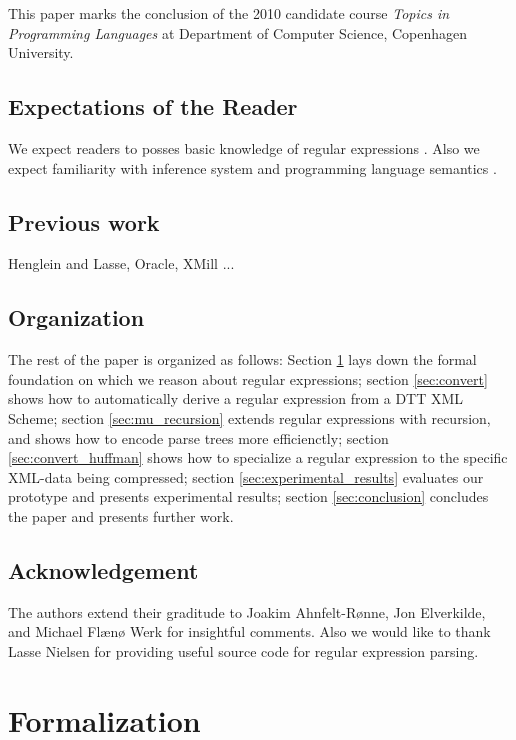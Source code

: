 \documentclass[a4paper, oneside]{memoir}
\theoremstyle{definition}
\begin{document}
This paper marks the conclusion of the 2010 candidate course \emph{Topics in Programming Languages} at Department of Computer Science, Copenhagen University.

\subsection{Expectations of the Reader}

We expect readers to posses basic knowledge of regular expressions \cite{FIX ME}. Also we expect familiarity with inference system and programming language semantics \cite{FIX ME}.

\subsection{Previous work}

Henglein and Lasse, Oracle, XMill ...

\subsection{Organization}

The rest of the paper is organized as follows:
Section \ref{sec:formalization} lays down the formal foundation on which we reason about regular expressions;
section \ref{sec:convert} shows how to automatically derive a regular expression from a DTT XML Scheme;
section \ref{sec:mu_recursion} extends regular expressions with recursion, and shows how to encode parse trees more efficienctly;
section \ref{sec:convert_huffman} shows how to specialize a regular expression to the specific XML-data being compressed;
section \ref{sec:experimental_results} evaluates our prototype and presents experimental results;
section \ref{sec:conclusion} concludes the paper and presents further work.

\subsection{Acknowledgement}

The authors extend their graditude to Joakim Ahnfelt-Rønne, Jon Elverkilde, and Michael Flænø Werk for insightful comments. Also we would like to thank Lasse Nielsen for providing useful source code for regular expression parsing.

\newpage

\section{Formalization}
\label{sec:formalization}
\end{document}
